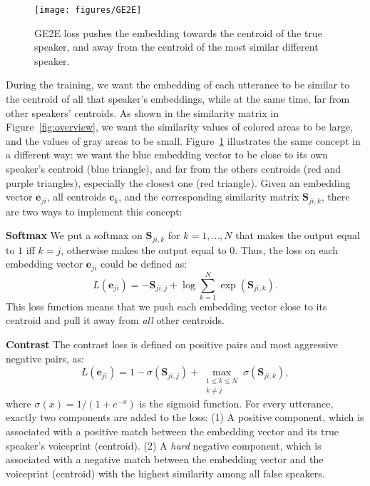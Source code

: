 \documentclass{article}
\newcommand{\ve}{\mathbf{e}}
\newcommand{\vc}{\mathbf{c}}
\newcommand{\ms}{\mathbf{S}}
\begin{document}
\begin{figure}
  \centering
    \texttt{[image: figures/GE2E]}
  \caption{GE2E loss pushes the embedding towards the centroid of the true
  speaker, and away from the centroid of the most similar different speaker.}
  \label{fig:ge2e}
\end{figure}

During the training, we want the embedding of each utterance to be similar to the
centroid of all that speaker's embeddings, while at the same time,
far from other speakers' centroids. As shown in
the similarity matrix in Figure~\ref{fig:overview}, we want the similarity values of
colored areas to be large, and the values of gray areas to be small.
Figure~\ref{fig:ge2e} illustrates the same concept in a different way:
we want the blue embedding vector to be close to its own speaker's centroid (blue
triangle), and far from the others centroids (red and purple triangles), especially
the closest one (red triangle). Given
an embedding vector $\ve_{ji}$,
all centroids $\vc_{k}$, and the corresponding similarity matrix $\ms_{ji,k}$,
there are two ways to implement this concept:

{\bf Softmax} We put a softmax on $\ms_{ji,k}$ for $k=1,\dots,N$
	that makes the output equal to $1$ iff $k=j$, otherwise makes the output equal
	to $0$. Thus, the loss on each embedding vector $\ve_{ji}$ could be defined as:
	\begin{equation}
		\label{eqn:softmax}
		L(\ve_{ji})=-\ms_{ji,j}+\log\sum_{k=1}^N\exp(\ms_{ji,k}).
	\end{equation}
	This loss function means that we push each embedding vector close to its
	centroid and pull it away from {\it all} other centroids.

{\bf Contrast} The contrast loss is defined on positive pairs and most
	aggressive negative pairs, as:
	\begin{equation}
		\label{eqn:contrast}
		L(\ve_{ji})=1-\sigma (\ms_{ji,j}) + \max_{\substack{1\leq k\leq N\\k\neq j}} \sigma (\ms_{ji,k}),
	\end{equation}
	where $\sigma(x)=1/(1+e^{-x})$ is the sigmoid function.
For every utterance, exactly two components are added to the loss:
	(1) A positive component, which is associated with a positive match
	between the embedding vector and its true speaker's voiceprint (centroid).
	(2) A \emph{hard} negative component, which is associated with a negative match
	between the embedding vector and the voiceprint (centroid) with the highest similarity among all
	false speakers.
\end{document}
